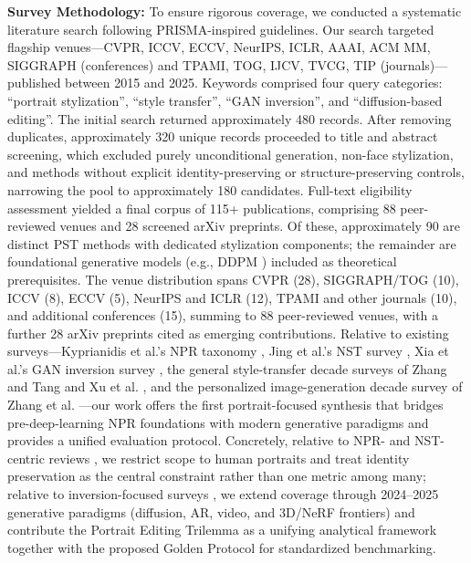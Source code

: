 \documentclass[journal]{IEEEtran}
\begin{document}
\textbf{Survey Methodology:} To ensure rigorous coverage, we conducted a systematic literature search following PRISMA-inspired guidelines. Our search targeted flagship venues---CVPR, ICCV, ECCV, NeurIPS, ICLR, AAAI, ACM MM, SIGGRAPH (conferences) and TPAMI, TOG, IJCV, TVCG, TIP (journals)---published between 2015 and 2025. Keywords comprised four query categories: ``portrait stylization'', ``style transfer'', ``GAN inversion'', and ``diffusion-based editing''. The initial search returned approximately 480 records. After removing duplicates, approximately 320 unique records proceeded to title and abstract screening, which excluded purely unconditional generation, non-face stylization, and methods without explicit identity-preserving or structure-preserving controls, narrowing the pool to approximately 180 candidates. Full-text eligibility assessment yielded a final corpus of 115+ publications, comprising 88 peer-reviewed venues and 28 screened arXiv preprints. Of these, approximately 90 are distinct PST methods with dedicated stylization components; the remainder are foundational generative models (e.g., DDPM \cite{ho2020denoising}) included as theoretical prerequisites. The venue distribution spans CVPR (28), SIGGRAPH/TOG (10), ICCV (8), ECCV (5), NeurIPS and ICLR (12), TPAMI and other journals (10), and additional conferences (15), summing to 88 peer-reviewed venues, with a further 28 arXiv preprints cited as emerging contributions. Relative to existing surveys---Kyprianidis et al.'s NPR taxonomy \cite{kyprianidis2013state}, Jing et al.'s NST survey \cite{jing2020neural}, Xia et al.'s GAN inversion survey \cite{xia2023gan}, the general style-transfer decade surveys of Zhang and Tang \cite{zhang2025decadesurvey} and Xu et al. \cite{xu2025stylereview}, and the personalized image-generation decade survey of Zhang et al. \cite{zhang2025personalized}---our work offers the first portrait-focused synthesis that bridges pre-deep-learning NPR foundations with modern generative paradigms and provides a unified evaluation protocol. Concretely, relative to NPR- and NST-centric reviews \cite{kyprianidis2013state,jing2020neural}, we restrict scope to human portraits and treat identity preservation as the central constraint rather than one metric among many; relative to inversion-focused surveys \cite{xia2023gan}, we extend coverage through 2024--2025 generative paradigms (diffusion, AR, video, and 3D/NeRF frontiers) and contribute the Portrait Editing Trilemma as a unifying analytical framework together with the proposed Golden Protocol for standardized benchmarking.
\end{document}
